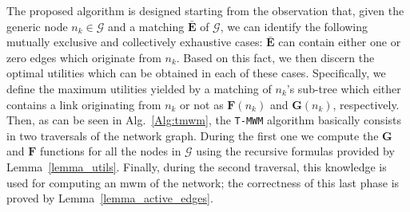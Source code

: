 The proposed algorithm is designed starting from the observation that, given the generic node $n_k \in \mathcal{G}$ and a matching $\mathbf{\bar{E}}$ of $\mathcal{G}$, we can identify the following mutually exclusive and collectively exhaustive cases: $\mathbf{\bar{E}}$ can contain either one or zero edges which originate from $n_k$. Based on this fact, we then discern the optimal utilities which can be obtained in each of these cases. Specifically, we define the maximum utilities yielded by a matching of $n_k$'s sub-tree which either contains a link originating from $n_k$ or not as $\mathbf{F}(n_k)$ and $\mathbf{G}(n_k)$, respectively.
Then, as can be seen in Alg.~\ref{Alg:tmwm}, the \texttt{T-MWM} algorithm basically consists in two traversals of the network graph. During the first one we compute the $\mathbf{G}$ and $\mathbf{F}$ functions for all the nodes in $\mathcal{G}$ using the recursive formulas provided by Lemma~\ref{lemma_utils}. Finally, during the second traversal, this knowledge is used for computing an \gls{mwm} of the network; the correctness of this last phase is proved by Lemma~\ref{lemma_active_edges}.

